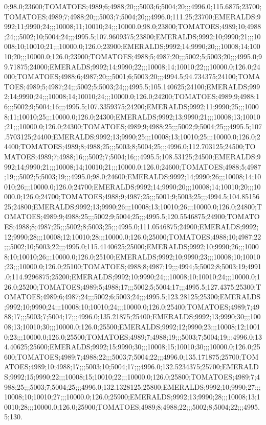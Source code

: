 0;98.0;23600;TOMATOES;4989;6;4988;20;;;5003;6;5004;20;;;4996.0;115.6875;23700;TOMATOES;4989;7;4988;20;;;5003;7;5004;20;;;4996.0;111.25;23700;EMERALDS;9992;11;9990;24;;;10008;11;10010;24;;;10000.0;98.0;23800;TOMATOES;4989;10;4988;24;;;5002;10;5004;24;;;4995.5;107.9609375;23800;EMERALDS;9992;10;9990;21;;;10008;10;10010;21;;;10000.0;126.0;23900;EMERALDS;9992;14;9990;20;;;10008;14;10010;20;;;10000.0;126.0;23900;TOMATOES;4988;5;4987;20;;;5002;5;5003;20;;;4995.0;99.71875;24000;EMERALDS;9992;14;9990;22;;;10008;14;10010;22;;;10000.0;126.0;24000;TOMATOES;4988;6;4987;20;;;5001;6;5003;20;;;4994.5;94.734375;24100;TOMATOES;4989;5;4987;24;;;5002;5;5003;24;;;4995.5;105.140625;24100;EMERALDS;9992;14;9990;24;;;10008;14;10010;24;;;10000.0;126.0;24200;TOMATOES;4989;9;4988;16;;;5002;9;5004;16;;;4995.5;107.3359375;24200;EMERALDS;9992;11;9990;25;;;10008;11;10010;25;;;10000.0;126.0;24300;EMERALDS;9992;13;9990;21;;;10008;13;10010;21;;;10000.0;126.0;24300;TOMATOES;4989;9;4988;25;;;5002;9;5004;25;;;4995.5;107.5703125;24400;EMERALDS;9992;13;9990;25;;;10008;13;10010;25;;;10000.0;126.0;24400;TOMATOES;4989;8;4988;25;;;5003;8;5004;25;;;4996.0;112.703125;24500;TOMATOES;4989;7;4988;16;;;5002;7;5004;16;;;4995.5;108.53125;24500;EMERALDS;9992;14;9990;21;;;10008;14;10010;21;;;10000.0;126.0;24600;TOMATOES;4988;5;4987;19;;;5002;5;5003;19;;;4995.0;98.0;24600;EMERALDS;9992;14;9990;26;;;10008;14;10010;26;;;10000.0;126.0;24700;EMERALDS;9992;14;9990;20;;;10008;14;10010;20;;;10000.0;126.0;24700;TOMATOES;4988;9;4987;25;;;5001;9;5003;25;;;4994.5;104.8515625;24800;EMERALDS;9992;13;9990;26;;;10008;13;10010;26;;;10000.0;126.0;24800;TOMATOES;4989;9;4988;25;;;5002;9;5004;25;;;4995.5;120.5546875;24900;TOMATOES;4988;8;4987;25;;;5002;8;5003;25;;;4995.0;111.0546875;24900;EMERALDS;9992;12;9990;28;;;10008;12;10010;28;;;10000.0;126.0;25000;TOMATOES;4988;10;4987;22;;;5002;10;5003;22;;;4995.0;115.4140625;25000;EMERALDS;9992;10;9990;26;;;10008;10;10010;26;;;10000.0;126.0;25100;EMERALDS;9992;10;9990;23;;;10008;10;10010;23;;;10000.0;126.0;25100;TOMATOES;4988;8;4987;19;;;4994;5;5002;8;5003;19;4991.0;114.9296875;25200;EMERALDS;9992;10;9990;24;;;10008;10;10010;24;;;10000.0;126.0;25200;TOMATOES;4989;5;4988;17;;;5002;5;5004;17;;;4995.5;127.4375;25300;TOMATOES;4989;6;4987;24;;;5002;6;5003;24;;;4995.5;123.28125;25300;EMERALDS;9992;10;9990;24;;;10008;10;10010;24;;;10000.0;126.0;25400;TOMATOES;4989;7;4988;17;;;5003;7;5004;17;;;4996.0;135.21875;25400;EMERALDS;9992;13;9990;30;;;10008;13;10010;30;;;10000.0;126.0;25500;EMERALDS;9992;12;9990;23;;;10008;12;10010;23;;;10000.0;126.0;25500;TOMATOES;4989;7;4988;19;;;5003;7;5004;19;;;4996.0;134.40625;25600;EMERALDS;9992;15;9990;30;;;10008;15;10010;30;;;10000.0;126.0;25600;TOMATOES;4989;7;4988;22;;;5003;7;5004;22;;;4996.0;135.171875;25700;TOMATOES;4989;10;4988;17;;;5003;10;5004;17;;;4996.0;132.5234375;25700;EMERALDS;9992;15;9990;22;;;10008;15;10010;22;;;10000.0;126.0;25800;TOMATOES;4989;7;4988;25;;;5003;7;5004;25;;;4996.0;132.1328125;25800;EMERALDS;9992;10;9990;27;;;10008;10;10010;27;;;10000.0;126.0;25900;EMERALDS;9992;13;9990;28;;;10008;13;10010;28;;;10000.0;126.0;25900;TOMATOES;4989;8;4988;22;;;5002;8;5004;22;;;4995.5;130.